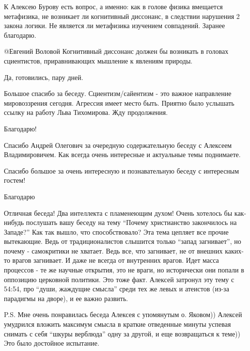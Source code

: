 \begin{multicols}{2}
\begin{itemize}
К Алексею Бурову есть вопрос, а именно: как в голове физика вмещается
метафизика, не возникает ли когнитивный диссонанс,  в следствии нарушения 2
закона логики.  Не является ли метафизика изучением совпадений.  Заранее
благодарю.


 @Евгений Воловой  Когнитивный диссонанс должен бы возникать в головах
 сциентистов, приравнивающих мышление к явлениям природы.

Да, готовились, пару дней.
\end{itemize} %


Большое спасибо за беседу. Сциентизм/сайентизм - это важное направление
мировоззрения сегодня. Агрессия имеет место быть. Приятно было услышать ссылку
на работу Льва Тихомирова. Жду продолжения.

Благодарю!


Спасибо Андрей Олегович за очередную содержательную беседу с Алексеем
Владимировичем. Как всегда очень интересные и актуальные темы поднимаете.


Спасибо большое за очень интересную и познавательную беседу с интересным гостем!

Благодарю


Отличная беседа! Два интеллекта с пламенеющим духом! Очень хотелось бы
как-нибудь послушать вашу беседу на тему \enquote{Почему христианство закончилось на
Западе?} Как так вышло, что способствовало? Эта тема цепляет все прочие
вытекающие. Ведь от традиционалистов слышится только \enquote{запад загнивает}, но
почему - самокритики не хватает. Ведь все, что загнивает, не от внешних
каких-то врагов загнивает. И даже не всегда от внутренних врагов. Идет масса
процессов - те же научные открытия, это не враги, но исторически они попали в
оппозицию церковной политики. Это тоже факт. Алексей затронул эту тему с 54:54,
про \enquote{души, жаждущие смысла} среди тех же левых и атеистов (из-за парадигмы на
дворе), и ее важно развить. 

P.S. Мне очень понравилась беседа Алексея с упомянутым о. Яковом)) Алексей
умудрился вложить максимум смысла в краткие отведенные минуты успевая снимать с
себя \enquote{шкуры верблюда} одну за другой, и еще возвращаться к теме)) Это было
достойное испытание.


\end{multicols}
